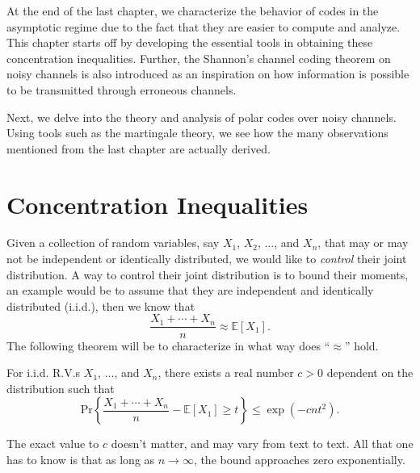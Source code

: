 
At the end of the last chapter, we characterize the behavior of codes in the asymptotic regime due to the fact that they are easier to compute and analyze. This chapter starts off by developing the essential tools in obtaining these concentration inequalities. Further, the Shannon's channel coding theorem on noisy channels is also introduced as an inspiration on how information is possible to be transmitted through erroneous channels.

Next, we delve into the theory and analysis of polar codes over noisy channels. Using tools such as the martingale theory, we see how the many observations mentioned from the last chapter are actually derived.

\section{Concentration Inequalities}
Given a collection of random variables, say $X_1$, $X_2$, $\ldots$, and $X_n$, that may or may not be independent or identically distributed, we would like to \textit{control} their joint distribution. A way to control their joint distribution is to bound their moments, an example would be to assume that they are independent and identically distributed (i.i.d.), then we know that
\begin{equation*}
    \frac{X_1+\cdots+X_n}{n} \approx \mathbb{E}[X_1].
\end{equation*}
The following theorem will be to characterize in what way does ``$\approx$'' hold.

\begin{theorem}
    For i.i.d. R.V.s $X_1$, $\ldots$, and $X_n$, there exists a real number $c>0$ dependent on the distribution such that
    \begin{equation}
        \mathrm{Pr}\left\{\frac{X_1+\cdots+X_n}{n} - \mathbb{E}[X_1] \ge t\right\} \le \exp\left(-cnt^2\right).
    \end{equation}
\end{theorem}
The exact value to $c$ doesn't matter, and may vary from text to text. All that one has to know is that as long as $n\rightarrow\infty$, the bound approaches zero exponentially.

